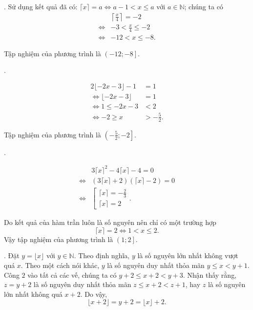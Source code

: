 \solution

\setcounter{subexercise}{1}
. Sử dụng kết quả đã có: $\lceil x \rceil = a \iff a - 1 < x \leq a$ với $a \in \mathbb{N}$; chúng ta có
\begin{align*}
   &\left\lceil \frac{x}{4} \right\rceil = -2 \\
   \iff &-3 < \frac{x}{4} \leq -2 \\
   \iff &-12 < x \leq -8.
\end{align*}

Tập nghiệm của phương trình là $\left(-12; -8\right]$.

. 

\begin{align*}
   2\lfloor -2x - 3 \rfloor - 1 &= 1 \\
   \iff \lfloor -2x - 3 \rfloor &= 1 \\
   \iff 1 \leq -2x - 3 &< 2 \\
   \iff -2 \geq x &> -\frac{5}{2}.
\end{align*}

Tập nghiệm của phương trình là $\left(-\frac{5}{2}; -2\right]$.

.

\begin{align*}
   &3\lceil x \rceil^2 - 4\lceil x \rceil - 4 = 0 \\
   \iff &\left(3\lceil x \rceil + 2\right)\left(\lceil x \rceil - 2\right) = 0 \\
   \iff &\left[\begin{array}{l}
      \lceil x \rceil = -\frac{2}{3} \\
      \lceil x \rceil = 2
   \end{array}\right..
\end{align*}

Do kết quả của hàm trần luôn là số nguyên nên chỉ có một trường hợp
\begin{equation*}
   \lceil x \rceil = 2 \iff 1 < x \leq 2.
\end{equation*}
Vậy tập nghiệm của phương trình là $\left(1; 2\right]$.

. Đặt $y = \lfloor x \rfloor$ với $y \in \mathbb{N}$. Theo định nghĩa, $y$ là số nguyên lớn nhất không vượt quá $x$. Theo một cách nói khác, $y$ là số nguyên duy nhất thỏa mãn $y \leq x < y + 1$. Công $2$ vào tất cả các vế, chúng ta có $y + 2 \leq x + 2 < y + 3$. Nhận thấy rằng, $z = y + 2$ là số nguyên duy nhất thỏa mãn $z \leq x + 2 < z + 1$, hay $z$ là số nguyên lớn nhất không quá $x + 2$. Do vậy, 
\begin{equation}
   \lfloor x + 2 \rfloor = y + 2 = \lfloor x \rfloor + 2.
\end{equation}

